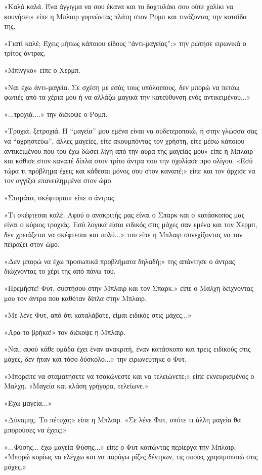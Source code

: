 \documentclass[12pt,twoside, openany]{book}
\begin{document}
«Καλά καλά. Ένα άγγιγμα να σου έκανα και το δαχτυλάκι σου ούτε χαλίκι να κουνήσει» είπε η Μπλαιρ γυρνώντας πλάτη στον Ρομπ και τινάζοντας την κοτσίδα της.

«Γιατί καλέ; Έχεις μήπως κάποιου είδους “άντι-μαγείας”;» την ρώτησε ειρωνικά ο τρίτος άντρας.

«Μπίνγκο» είπε ο Χερμπ.

«Ναι έχω άντι-μαγεία. Σε σχέση με εσάς τους υπόλοιπους, δεν μπορώ να πετάω φωτιές από τα χέρια μου ή να αλλάζω μαγικά την κατεύθυνση ενός αντικειμένου...»

«...τροχιά....» την διέκοψε ο Ρομπ.

«Τροχιά, ξετροχιά. Η “μαγεία” μου εμένα είναι να ουδετεροποιώ, ή στην γλώσσα σας να “αχρηστεύω”, άλλες μαγείες, είτε ακουμπόντας τον χρήστη, είτε μέσω κάποιου αντικειμένου που του έχω δώσει λίγη από την αύρα της μαγείας μου» είπε η Μπλαιρ και κάθισε στον καναπέ δίπλα στον τρίτο άντρα που την σχολίασε προ ολίγου. «Εσύ τώρα τι πρόβλημα έχεις και κάθεσαι μόνος σου στον καναπέ;» είπε και τον άρχισε να τον αγγίζει επανειλημμένα στον ώμο.

«Σταμάτα, σκέφτομαι» είπε ο άντρας.

«Τι σκέφτεσαι καλέ. Αφού ο ανακριτής μας είναι ο Σπαρκ και ο κατάσκοπος μας είναι ο κύριος τροχιάς. Εσύ λογικά είσαι ειδικός στις μάχες σαν εμένα και τον Χερμπ, δεν χρειάζεται να σκέφτεσαι και πολύ...» του είπε η Μπλαιρ συνεχίζοντας να τον πειράζει στον ώμο.

«Δεν μπορώ να έχω προσωπικά προβλήματα δηλαδή;» της απάντησε ο άντρας διώχνοντας το χέρι της από πάνω του.

«Ηρεμήστε! Φυτ, συστήσου στην Μπλαιρ και τον Σπαρκ.» είπε ο Μαλχη δείχνοντας μου τον άντρα που καθόταν δίπλα στην Μπλαιρ.

«Με λένε Φυτ, από ότι καταλάβατε, είμαι ειδικός στις μάχες...»

«Άρα το βρήκα!» τον διέκοψε η Μπλαιρ.

«Ναι, αφού κάθε ομάδα έχει έναν ανακριτή, έναν κατάσκοπο και τρεις ειδικούς στις μάχες, δεν ήταν και τόσο δύσκολο...» την ειρωνεύτηκε ο Φυτ.

«Μπορείτε να σταματήσετε να τσακώνεστε και να τελειώνετε;» είπε εκνευρισμένος ο Μαλχη. «Μαγεία και κλάση γρήγορα, τελείωνε.»

«Έχω μαγεία...»

«Δύναμης. Το πέτυχα;» είπε η Μπλαιρ. «Σε λένε Φυτ, οπότε τι άλλη μαγεία θα μπορούσες να έχεις;»

«...Φύσης... έχω μαγεία Φύσης...» είπε ο Φυτ κοιτώντας περίεργα την Μπλαιρ. «Μπορώ κυρίως να ελέγχω και να παράγω ρίζες δέντρων, τις οποίες χρησιμοποιώ στις μάχες.»
\end{document}
